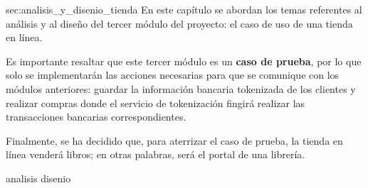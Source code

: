 %
%

  {sec:analisis_y_disenio_tienda}{%
  }%
%
En este capítulo se abordan los temas referentes al análisis y al diseño del
tercer módulo del proyecto: el caso de uso de una tienda en línea.

Es importante resaltar que este tercer módulo es un \textbf{caso de prueba},
por lo que solo se implementarán las acciones necesarias para que se comunique
con los módulos anteriores: guardar la información bancaria tokenizada de los
clientes y realizar compras donde el servicio de tokenización fingirá realizar
las transacciones bancarias correspondientes.

Finalmente, se ha decidido que, para aterrizar el caso de prueba, la tienda en
línea venderá libros; en otras palabras, será el portal de una librería.

{analisis}
{disenio}
